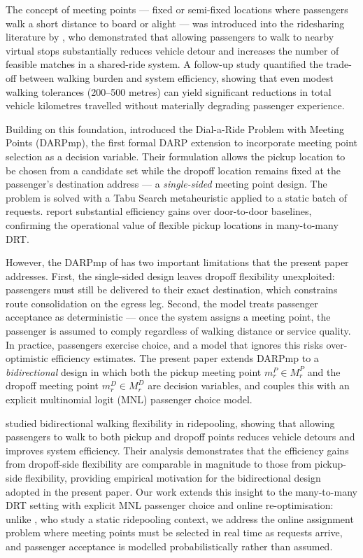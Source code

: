 The concept of meeting points — fixed or semi-fixed locations where passengers walk a short distance to board or alight — was introduced into the ridesharing literature by \citet{stiglic2015}, who demonstrated that allowing passengers to walk to nearby virtual stops substantially reduces vehicle detour and increases the number of feasible matches in a shared-ride system. A follow-up study \citep{stiglic2018} quantified the trade-off between walking burden and system efficiency, showing that even modest walking tolerances (200--500 metres) can yield significant reductions in total vehicle kilometres travelled without materially degrading passenger experience.

Building on this foundation, \citet{cortenbach2024} introduced the Dial-a-Ride Problem with Meeting Points (DARPmp), the first formal DARP extension to incorporate meeting point selection as a decision variable. Their formulation allows the pickup location to be chosen from a candidate set while the dropoff location remains fixed at the passenger's destination address — a \emph{single-sided} meeting point design. The problem is solved with a Tabu Search metaheuristic applied to a static batch of requests. \citet{cortenbach2024} report substantial efficiency gains over door-to-door baselines, confirming the operational value of flexible pickup locations in many-to-many DRT.

However, the DARPmp of \citet{cortenbach2024} has two important limitations that the present paper addresses. First, the single-sided design leaves dropoff flexibility unexploited: passengers must still be delivered to their exact destination, which constrains route consolidation on the egress leg. Second, the model treats passenger acceptance as deterministic — once the system assigns a meeting point, the passenger is assumed to comply regardless of walking distance or service quality. In practice, passengers exercise choice, and a model that ignores this risks over-optimistic efficiency estimates. The present paper extends DARPmp to a \emph{bidirectional} design in which both the pickup meeting point $m_r^P \in M_r^P$ and the dropoff meeting point $m_r^D \in M_r^D$ are decision variables, and couples this with an explicit multinomial logit (MNL) passenger choice model.

\citet{fielbaum2021} studied bidirectional walking flexibility in ridepooling, showing
that allowing passengers to walk to both pickup and dropoff points reduces vehicle detours
and improves system efficiency. Their analysis demonstrates that the efficiency gains from
dropoff-side flexibility are comparable in magnitude to those from pickup-side flexibility,
providing empirical motivation for the bidirectional design adopted in the present paper.
Our work extends this insight to the many-to-many DRT setting with explicit MNL passenger
choice and online re-optimisation: unlike \citet{fielbaum2021}, who study a static
ridepooling context, we address the online assignment problem where meeting points must be
selected in real time as requests arrive, and passenger acceptance is modelled
probabilistically rather than assumed.


